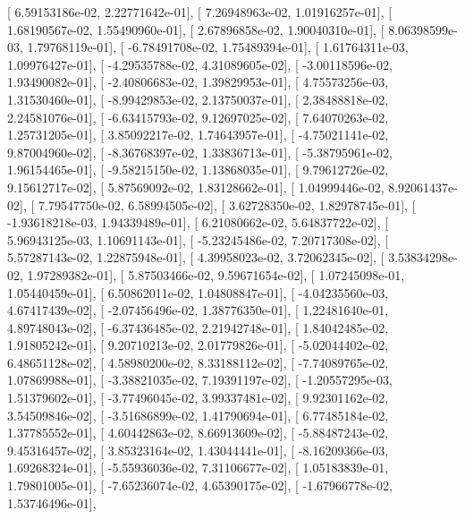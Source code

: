 \documentclass{article}
\begin{document}
       [  6.59153186e-02,   2.22771642e-01],
       [  7.26948963e-02,   1.01916257e-01],
       [  1.68190567e-02,   1.55490960e-01],
       [  2.67896858e-02,   1.90040310e-01],
       [  8.06398599e-03,   1.79768119e-01],
       [ -6.78491708e-02,   1.75489394e-01],
       [  1.61764311e-03,   1.09976427e-01],
       [ -4.29535788e-02,   4.31089605e-02],
       [ -3.00118596e-02,   1.93490082e-01],
       [ -2.40806683e-02,   1.39829953e-01],
       [  4.75573256e-03,   1.31530460e-01],
       [ -8.99429853e-02,   2.13750037e-01],
       [  2.38488818e-02,   2.24581076e-01],
       [ -6.63415793e-02,   9.12697025e-02],
       [  7.64070263e-02,   1.25731205e-01],
       [  3.85092217e-02,   1.74643957e-01],
       [ -4.75021141e-02,   9.87004960e-02],
       [ -8.36768397e-02,   1.33836713e-01],
       [ -5.38795961e-02,   1.96154465e-01],
       [ -9.58215150e-02,   1.13868035e-01],
       [  9.79612726e-02,   9.15612717e-02],
       [  5.87569092e-02,   1.83128662e-01],
       [  1.04999446e-02,   8.92061437e-02],
       [  7.79547750e-02,   6.58994505e-02],
       [  3.62728350e-02,   1.82978745e-01],
       [ -1.93618218e-03,   1.94339489e-01],
       [  6.21080662e-02,   5.64837722e-02],
       [  5.96943125e-03,   1.10691143e-01],
       [ -5.23245486e-02,   7.20717308e-02],
       [  5.57287143e-02,   1.22875948e-01],
       [  4.39958023e-02,   3.72062345e-02],
       [  3.53834298e-02,   1.97289382e-01],
       [  5.87503466e-02,   9.59671654e-02],
       [  1.07245098e-01,   1.05440459e-01],
       [  6.50862011e-02,   1.04808847e-01],
       [ -4.04235560e-03,   4.67417439e-02],
       [ -2.07456496e-02,   1.38776350e-01],
       [  1.22481640e-01,   4.89748043e-02],
       [ -6.37436485e-02,   2.21942748e-01],
       [  1.84042485e-02,   1.91805242e-01],
       [  9.20710213e-02,   2.01779826e-01],
       [ -5.02044402e-02,   6.48651128e-02],
       [  4.58980200e-02,   8.33188112e-02],
       [ -7.74089765e-02,   1.07869988e-01],
       [ -3.38821035e-02,   7.19391197e-02],
       [ -1.20557295e-03,   1.51379602e-01],
       [ -3.77496045e-02,   3.99337481e-02],
       [  9.92301162e-02,   3.54509846e-02],
       [ -3.51686899e-02,   1.41790694e-01],
       [  6.77485184e-02,   1.37785552e-01],
       [  4.60442863e-02,   8.66913609e-02],
       [ -5.88487243e-02,   9.45316457e-02],
       [  3.85323164e-02,   1.43044441e-01],
       [ -8.16209366e-03,   1.69268324e-01],
       [ -5.55936036e-02,   7.31106677e-02],
       [  1.05183839e-01,   1.79801005e-01],
       [ -7.65236074e-02,   4.65390175e-02],
       [ -1.67966778e-02,   1.53746496e-01],
\end{document}
